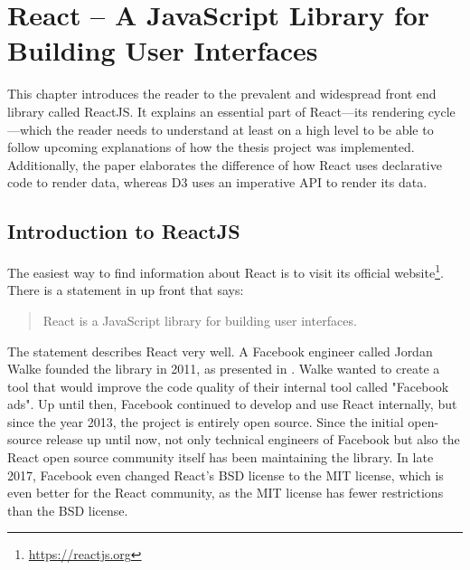 \chapter{React – A JavaScript Library for Building User Interfaces}
\label{cha:react}

This chapter introduces the reader to the prevalent and widespread front end library called ReactJS. It explains an essential part of React---its rendering cycle---which the reader needs to understand at least on a high level to be able to follow upcoming explanations of how the thesis project was implemented. Additionally, the paper elaborates the difference of how React uses declarative code to render data, whereas D3 uses an imperative API to render its data.

\section{Introduction to ReactJS}
\label{sec:reactIntro}

The easiest way to find information about React is to visit its official website\footnote{\url{https://reactjs.org}}. There is a statement in \cite{React} up front that says: \begin{quote}\begin{english}React is a JavaScript library for building user interfaces.\end{english}\end{quote} The statement describes React very well. A Facebook engineer called Jordan Walke founded the library in 2011, as presented in \cite[05:30]{ReactFoundingVideo}. Walke wanted to create a tool that would improve the code quality of their internal tool called "Facebook ads". Up until then, Facebook continued to develop and use React internally, but since the year 2013, the project is entirely open source. Since the initial open-source release up until now, not only technical engineers of Facebook but also the React open source community itself has been maintaining the library. In late 2017, Facebook even changed React's BSD license to the MIT license, which is even better for the React community, as the MIT license has fewer restrictions than the BSD license.

